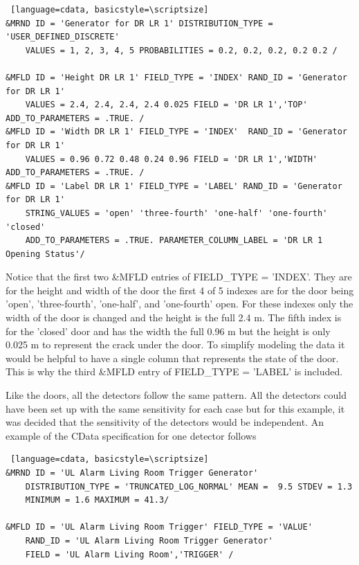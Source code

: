 \documentclass[12pt,twoside]{book}
\begin{document}
\vspace{\baselineskip}
\begin{lstlisting} [language=cdata, basicstyle=\scriptsize]
&MRND ID = 'Generator for DR LR 1' DISTRIBUTION_TYPE = 'USER_DEFINED_DISCRETE'
	VALUES = 1, 2, 3, 4, 5 PROBABILITIES = 0.2, 0.2, 0.2, 0.2 0.2 /

&MFLD ID = 'Height DR LR 1' FIELD_TYPE = 'INDEX' RAND_ID = 'Generator for DR LR 1'
	VALUES = 2.4, 2.4, 2.4, 2.4 0.025 FIELD = 'DR LR 1','TOP' ADD_TO_PARAMETERS = .TRUE. /
&MFLD ID = 'Width DR LR 1' FIELD_TYPE = 'INDEX'  RAND_ID = 'Generator for DR LR 1'
	VALUES = 0.96 0.72 0.48 0.24 0.96 FIELD = 'DR LR 1','WIDTH' ADD_TO_PARAMETERS = .TRUE. /
&MFLD ID = 'Label DR LR 1' FIELD_TYPE = 'LABEL' RAND_ID = 'Generator for DR LR 1'
	STRING_VALUES = 'open' 'three-fourth' 'one-half' 'one-fourth' 'closed'
	ADD_TO_PARAMETERS = .TRUE. PARAMETER_COLUMN_LABEL = 'DR LR 1 Opening Status'/
\end{lstlisting}

Notice that the first two  {\ct \&MFLD} entries of  {\ct FIELD\_TYPE = 'INDEX'}. They are for the height and width of the door the first 4 of 5 indexes are for the door being 'open', 'three-fourth', 'one-half', and  'one-fourth' open. For these indexes only the width of the door is changed and the height is the full 2.4 m. The fifth index is for the 'closed' door and has the width the full 0.96 m but the height is only 0.025 m to represent the crack under the door. To simplify modeling the data it would be helpful to have a single column that represents the state of the door. This is why the third {\ct \&MFLD} entry of {\ct FIELD\_TYPE = 'LABEL'} is included.

Like the doors, all the detectors follow the same pattern. All the detectors could have been set up with the same sensitivity for each case but for this example, it was decided that the sensitivity of the detectors would be independent. An example of the CData specification for one detector follows

\vspace{\baselineskip}
\begin{lstlisting} [language=cdata, basicstyle=\scriptsize]
&MRND ID = 'UL Alarm Living Room Trigger Generator'
	DISTRIBUTION_TYPE = 'TRUNCATED_LOG_NORMAL' MEAN =  9.5 STDEV = 1.3
	MINIMUM = 1.6 MAXIMUM = 41.3/
	
&MFLD ID = 'UL Alarm Living Room Trigger' FIELD_TYPE = 'VALUE'
	RAND_ID = 'UL Alarm Living Room Trigger Generator'
    FIELD = 'UL Alarm Living Room','TRIGGER' /
\end{lstlisting}
\end{document}

